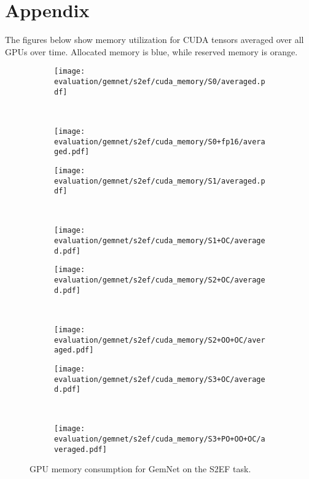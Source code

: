 \section*{Appendix}

The figures below show memory utilization for 
CUDA tensors averaged over all GPUs over time. 
Allocated memory is \textcolor{tum-dark-blue}{blue},
while reserved memory is \textcolor{tum-orange}{orange}.

\begin{figure}[H]

    \centering

    \begin{subfigure}[t]{0.45\textwidth}
        \centering
        \texttt{[image: evaluation/gemnet/s2ef/cuda\_memory/S0/averaged.pdf]}
    \end{subfigure}%
    ~
    \begin{subfigure}[t]{0.45\textwidth}
        \centering
        \texttt{[image: evaluation/gemnet/s2ef/cuda\_memory/S0+fp16/averaged.pdf]}
    \end{subfigure}

    \begin{subfigure}[t]{0.45\textwidth}
        \centering
        \texttt{[image: evaluation/gemnet/s2ef/cuda\_memory/S1/averaged.pdf]}
    \end{subfigure}%
    ~
    \begin{subfigure}[t]{0.45\textwidth}
        \centering
        \texttt{[image: evaluation/gemnet/s2ef/cuda\_memory/S1+OC/averaged.pdf]}
    \end{subfigure}

    \begin{subfigure}[t]{0.45\textwidth}
        \centering
        \texttt{[image: evaluation/gemnet/s2ef/cuda\_memory/S2+OC/averaged.pdf]}
    \end{subfigure}%
    ~
    \begin{subfigure}[t]{0.45\textwidth}
        \centering
        \texttt{[image: evaluation/gemnet/s2ef/cuda\_memory/S2+OO+OC/averaged.pdf]}
    \end{subfigure}

    \begin{subfigure}[t]{0.45\textwidth}
        \centering
        \texttt{[image: evaluation/gemnet/s2ef/cuda\_memory/S3+OC/averaged.pdf]}
    \end{subfigure}%
    ~
    \begin{subfigure}[t]{0.45\textwidth}
        \centering
        \texttt{[image: evaluation/gemnet/s2ef/cuda\_memory/S3+PO+OO+OC/averaged.pdf]}
    \end{subfigure}

    \caption{GPU memory consumption for GemNet on the S2EF task.}
    
\end{figure}

